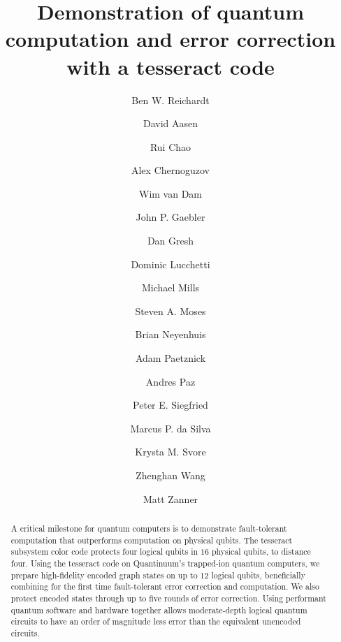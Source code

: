 \documentclass[10pt, twocolumn, aps, nofootinbib, longbibliography, nobibnotes, superscriptaddress]{revtex4-1} %
\begin{document}

\fi


\title{
Demonstration of quantum computation and error correction %
with a tesseract %
code %
}


\author{Ben W. Reichardt}

\author{David Aasen}
\author{Rui Chao}

\author{Alex Chernoguzov}

\author{Wim van Dam}

\author{John P. Gaebler}
\author{Dan Gresh}
\author{Dominic Lucchetti}
\author{Michael Mills}
\author{Steven A. Moses}
\author{Brian Neyenhuis}

\author{Adam Paetznick}
\author{Andres Paz}

\author{Peter E. Siegfried}

\author{Marcus P. da Silva}
\author{Krysta M. Svore}
\author{Zhenghan Wang}
\author{Matt Zanner}


\begin{abstract}
A critical milestone for quantum computers is to demonstrate fault-tolerant computation that outperforms computation on physical qubits.  
The tesseract subsystem color code protects four logical qubits in $16$ physical qubits, to distance four.  
Using the tesseract code on Quantinuum's trapped-ion quantum computers, we prepare high-fidelity encoded graph states on up to $12$ logical qubits, beneficially combining for the first time fault-tolerant error correction and computation.  
We also protect encoded states through up to five rounds of error correction.  
Using performant quantum software and hardware together allows moderate-depth logical quantum circuits to have an order of magnitude less error than the equivalent unencoded circuits.  
\end{abstract}
\end{document}
